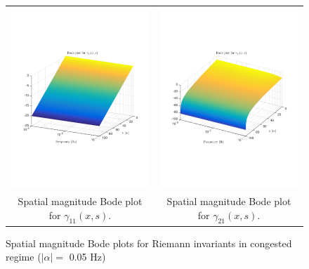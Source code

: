 \documentclass[preprint]{elsarticle}
\begin{document}
\begin{figure}
\centering
\begin{tabular}{cc}
\includegraphics[trim = 0mm 60mm 0mm 60mm, width = 8cm]{Bode_congested/distr_diag_gamma_11}
&
\includegraphics[trim = 0mm 60mm 0mm 60mm, width = 8cm]{Bode_congested/distr_diag_gamma_21}
\tabularnewline
Spatial magnitude Bode plot for $\gamma_{11}(x,s)$.
&
Spatial magnitude Bode plot for $\gamma_{21}(x,s)$.
\tabularnewline
\end{tabular}
\caption{Spatial magnitude Bode plots for Riemann invariants in congested regime ($\left|\alpha\right| = $ 0.05 Hz)\label{fig:Magn_spatial_diag_congested}}
\end{figure}
\end{document}
